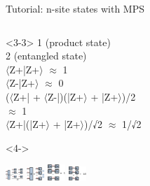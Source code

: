 \begin{frame}[fragile]{Tutorial: n-site states with MPS}
\begin{columns}
\begin{column}{5.5cm}
\begin{onlyenv}<3-3>
1 (product state) \\
2 (entangled state) \\
$\langle$Z+|Z+$\rangle$ $\approx$ 1 \\
$\langle$Z-|Z+$\rangle$ $\approx$ 0 \\
($\langle$Z+| + $\langle$Z-|)(|Z+$\rangle$ + |Z+$\rangle$)/2 \\
      $\approx$ 1 \\
$\langle$Z+|(|Z+$\rangle$ + |Z+$\rangle$)/√2 $\approx$ 1/√2 \\
\end{onlyenv}

\begin{onlyenv}<4->
\vspace*{0.0cm}
\begin{center}
\includegraphics[width=0.05\textwidth]{
  slides/assets/catn.png
}
\includegraphics[width=0.05\textwidth]{
  slides/assets/catn_mps.png
}
\includegraphics[width=0.05\textwidth]{
  slides/assets/Zpn_Zpn.png
}
\includegraphics[width=0.05\textwidth]{
  slides/assets/Zpn_catn.png
}
\end{center}
\vspace*{0.0cm}
\end{onlyenv}

\end{column}

\end{columns}

\end{frame}
